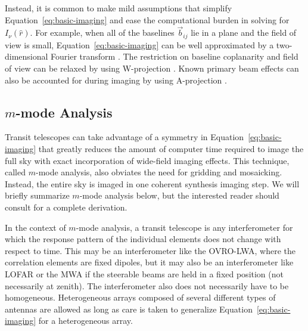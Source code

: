 \begin{bibunit}
Instead, it is common to make mild assumptions that simplify Equation~\ref{eq:basic-imaging} and
ease the computational burden in solving for $I_\nu(\hat r)$. For example, when all of the baselines
$\vec b_{ij}$ lie in a plane and the field of view is small, Equation~\ref{eq:basic-imaging} can be
well approximated by a two-dimensional Fourier transform \citep{2001isra.book.....T}. The
restriction on baseline coplanarity and field of view can be relaxed by using W-projection
\citep{2008ISTSP...2..647C}. Known primary beam effects can also be accounted for during imaging by
using A-projection \citep{2013ApJ...770...91B}.

\subsection{$m$-mode Analysis}\label{sec:mmode-analysis}

Transit telescopes can take advantage of a symmetry in Equation~\ref{eq:basic-imaging} that greatly
reduces the amount of computer time required to image the full sky with exact incorporation of
wide-field imaging effects. This technique, called $m$-mode analysis, also obviates the need for
gridding and mosaicking. Instead, the entire sky is imaged in one coherent synthesis imaging step.
We will briefly summarize $m$-mode analysis below, but the interested reader should consult
\citet{2014ApJ...781...57S, 2015PhRvD..91h3514S} for a complete derivation.

In the context of $m$-mode analysis, a transit telescope is any interferometer for which the
response pattern of the individual elements does not change with respect to time. This may be an
interferometer like the OVRO-LWA, where the correlation elements are fixed dipoles, but it may also
be an interferometer like LOFAR or the MWA if the steerable beams are held in a fixed position (not
necessarily at zenith). The interferometer also does not necessarily have to be homogeneous.
Heterogeneous arrays composed of several different types of antennas are allowed as long as care is
taken to generalize Equation~\ref{eq:basic-imaging} for a heterogeneous array.


\end{bibunit}

